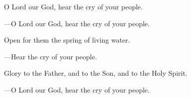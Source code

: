\responsory

\begin{hangpar}
O Lord our God, hear the cry of your people.

{\color{red}---\thinspace }O Lord our God, hear the cry of your people.

\medskip Open for them the spring of living water.

{\color{red}---\thinspace }Hear the cry of your people.

\medskip Glory to the Father, and to the Son, and to the Holy Spirit.

{\color{red}---\thinspace }O Lord our God, hear the cry of your people.
\end{hangpar}